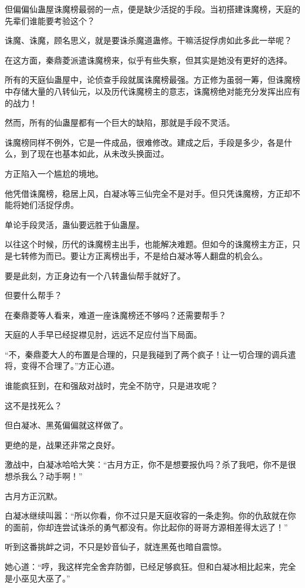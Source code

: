 \begin{this_body}
但偏偏仙蛊屋诛魔榜最弱的一点，便是缺少活捉的手段。当初搭建诛魔榜，天庭的先辈们谁能要考验这个？

诛魔、诛魔，顾名思义，就是要诛杀魔道蛊修。干嘛活捉俘虏如此多此一举呢？

在这方面，秦鼎菱派遣诛魔榜来，似乎有些失察，但其实是她没有更好的选择。

所有的天庭仙蛊屋中，论侦查手段就属诛魔榜最强。方正修为虽弱一筹，但诛魔榜中存储大量的八转仙元，以及历代诛魔榜主的意志，诛魔榜绝对能充分发挥出应有的战力！

然而，所有的仙蛊屋都有一个巨大的缺陷，那就是手段不灵活。

诛魔榜同样不例外，它是一件成品，很难修改。建成之后，手段是多少，各是什么，到了现在也基本如此，从未改头换面过。

方正陷入一个尴尬的境地。

他凭借诛魔榜，稳居上风，白凝冰等三仙完全不是对手。但只凭诛魔榜，方正却不能将她们活捉俘虏。

单论手段灵活，蛊仙要远胜于仙蛊屋。

以往这个时候，历代的诛魔榜主出手，也能解决难题。但如今的诛魔榜主方正，只是七转修为而已。要让方正离榜出手，不是给白凝冰等人翻盘的机会么。

要是此刻，方正身边有一个八转蛊仙帮手就好了。

但要什么帮手？

在秦鼎菱等人看来，难道一座诛魔榜还不够吗？还需要帮手？

天庭的人手早已经捉襟见肘，远远不足应付当下局面。

“不，秦鼎菱大人的布置是合理的，只是我碰到了两个疯子！让一切合理的调兵遣将，变得不合理了。”方正心道。

谁能疯狂到，在和强敌对战时，完全不防守，只是进攻呢？

这不是找死么？

但白凝冰、黑菟偏偏就这样做了。

更绝的是，战果还非常之良好。

激战中，白凝冰哈哈大笑：“古月方正，你不是想要报仇吗？杀了我吧，你不是很想杀我么？动手啊！”

古月方正沉默。

白凝冰继续叫嚣：“所以你看，你不过只是天庭收容的一条走狗。你的仇敌就在你的面前，你却连尝试诛杀的勇气都没有。你比起你的哥哥方源相差得太远了！”

听到这番挑衅之词，不只是妙音仙子，就连黑菟也暗自震惊。

她心道：“哼，我这样完全舍弃防御，已经足够疯狂。但和白凝冰相比起来，完全是小巫见大巫了。”


\end{this_body}
